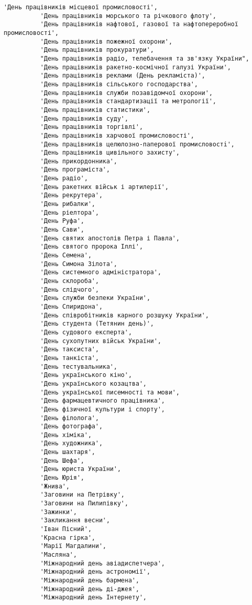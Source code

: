 \documentclass[11pt]{article}
\begin{document}
\begin{Verbatim}[commandchars=\\\{\}]
          'День працівників місцевої промисловості',
          'День працівників морського та річкового флоту',
          'День працівників нафтової, газової та нафтопереробної промисловості',
          'День працівників пожежної охорони',
          'День працівників прокуратури',
          "День працівників радіо, телебачення та зв'язку України",
          'День працівників ракетно-космічної галузі України',
          'День працівників реклами (День рекламіста)',
          'День працівників сільського господарства',
          'День працівників служби позавідомчої охорони',
          'День працівників стандартизації та метрології',
          'День працівників статистики',
          'День працівників суду',
          'День працівників торгівлі',
          'День працівників харчової промисловості',
          'День працівників целюлозно-паперової промисловостi',
          'День працівників цивільного захисту',
          'День прикордонника',
          'День програміста',
          'День радіо',
          'День ракетних військ і артилерії',
          'День рекрутера',
          'День рибалки',
          'День ріелтора',
          'День Руфа',
          'День Сави',
          'День святих апостолів Петра і Павла',
          'День святого пророка Іллі',
          'День Семена',
          'День Симона Зілота',
          'День системного адміністратора',
          'День склороба',
          'День слідчого',
          'День служби безпеки України',
          'День Спиридона',
          'День співробітників карного розшуку України',
          'День студента (Тетянин день)',
          'День судового експерта',
          'День сухопутних військ України',
          'День таксиста',
          'День танкіста',
          'День тестувальника',
          'День українського кіно',
          'День українського козацтва',
          'День української писемності та мови',
          'День фармацевтичного працівника',
          'День фізичної культури і спорту',
          'День філолога',
          'День фотографа',
          'День хіміка',
          'День художника',
          'День шахтаря',
          'День Шефа',
          'День юриста України',
          'День Юрія',
          'Жнива',
          'Заговини на Петрівку',
          'Заговини на Пилипівку',
          'Зажинки',
          'Закликання весни',
          'Іван Пісний',
          'Красна гірка',
          'Марії Магдалини',
          'Масляна',
          'Міжнародний день авіадиспетчера',
          'Міжнародний день астрономії',
          'Міжнародний день бармена',
          'Міжнародний день ді-джея',
          'Міжнародний день Інтернету',

\end{Verbatim}
\end{document}
